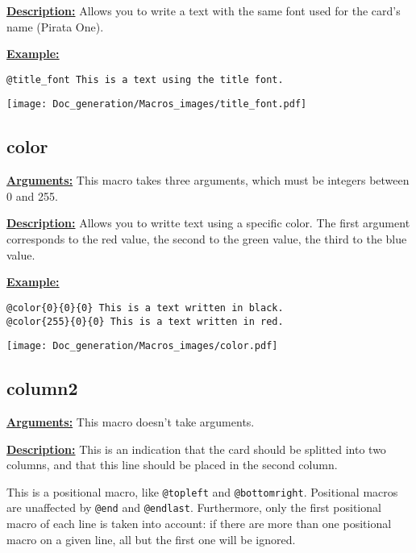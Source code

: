 \documentclass{article}
\begin{document}
\textbf{\underline{Description:}} Allows you to write a text with the same font used for the card's name (Pirata One).

\textbf{\underline{Example:}}

\begin{center}
\begin{BVerbatim}
@title_font This is a text using the title font.
\end{BVerbatim}

\texttt{[image: Doc\_generation/Macros\_images/title\_font.pdf]}
\end{center}

\subsection{color}
\textbf{\underline{Arguments:}} This macro takes three arguments, which must be integers between 0 and 255.

\textbf{\underline{Description:}} Allows you to writte text using a specific color. The first argument corresponds to the red value, the second to the green value, the third to the blue value.

\textbf{\underline{Example:}}

\begin{center}
\begin{BVerbatim}
@color{0}{0}{0} This is a text written in black.
@color{255}{0}{0} This is a text written in red.
\end{BVerbatim}

\texttt{[image: Doc\_generation/Macros\_images/color.pdf]}
\end{center}


\subsection{column2}
\textbf{\underline{Arguments:}} This macro doesn't take arguments.

\textbf{\underline{Description:}} This is an indication that the card should be splitted into two columns, and that this line should be placed in the second column.

This is a positional macro, like \verb`@topleft` and \verb`@bottomright`. Positional macros are unaffected by \verb`@end` and \verb`@endlast`. Furthermore, only the first positional macro of each line is taken into account: if there are more than one positional macro on a given line, all but the first one will be ignored.
\end{document}
